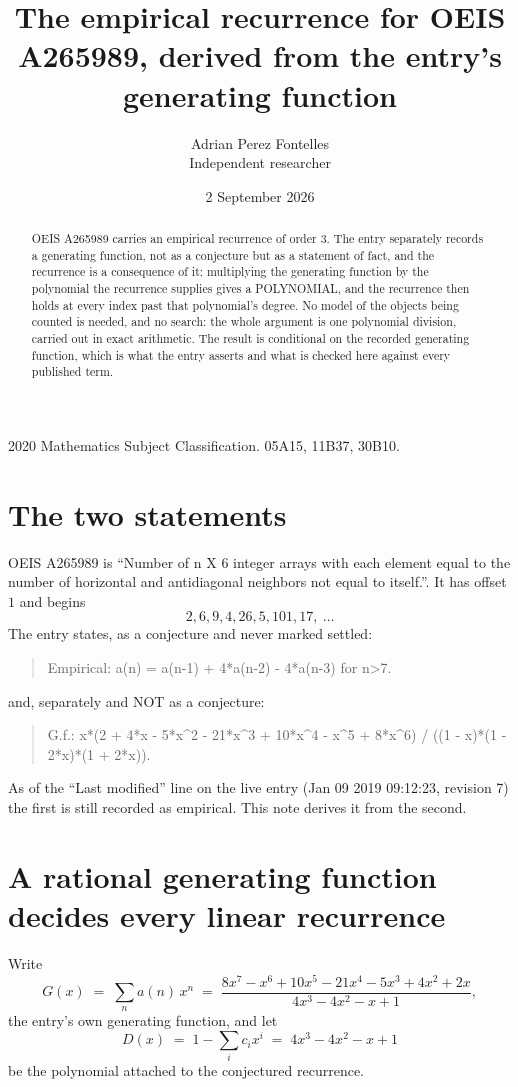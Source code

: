 \documentclass[11pt,a4paper]{article}
\title{The empirical recurrence for OEIS A265989, derived from the entry's generating function}
\author{Adrian Perez Fontelles\\ \small Independent researcher}
\date{2 September 2026}
\theoremstyle{plain}
\theoremstyle{definition}
\begin{document}
\maketitle

\begin{abstract}
OEIS A265989 carries an empirical recurrence of order $3$. The entry separately records a
generating function, not as a conjecture but as a statement of fact, and the recurrence is a
consequence of it: multiplying the generating function by the polynomial the recurrence
supplies gives a POLYNOMIAL, and the recurrence then holds at every index past that
polynomial's degree. No model of the objects being counted is needed, and no search: the
whole argument is one polynomial division, carried out in exact arithmetic. The result is
conditional on the recorded generating function, which is what the entry asserts and what is
checked here against every published term.
\end{abstract}

\noindent\small 2020 Mathematics Subject Classification. 05A15, 11B37, 30B10.\normalsize

\section{The two statements}

OEIS A265989 is ``Number of n X 6 integer arrays with each element equal to the number of horizontal and antidiagonal neighbors not equal to itself.''. It has offset $1$ and begins
\[
2, 6, 9, 4, 26, 5, 101, 17,\ \dots
\]
The entry states, as a conjecture and never marked settled:
\begin{quote}
Empirical: a(n) = a(n-1) + 4*a(n-2) - 4*a(n-3) for n>7.
\end{quote}
and, separately and NOT as a conjecture:
\begin{quote}
G.f.: x*(2 + 4*x - 5*x\^{}2 - 21*x\^{}3 + 10*x\^{}4 - x\^{}5 + 8*x\^{}6) / ((1 - x)*(1 - 2*x)*(1 + 2*x)).
\end{quote}
As of the ``Last modified'' line on the live entry (Jan 09 2019 09:12:23, revision 7) the first is still
recorded as empirical. This note derives it from the second.

\section{A rational generating function decides every linear recurrence}

Write
\[
G(x)\;=\;\sum_{n}a(n)\,x^{n}\;=\;\frac{8 x^{7} - x^{6} + 10 x^{5} - 21 x^{4} - 5 x^{3} + 4 x^{2} + 2 x}{4 x^{3} - 4 x^{2} - x + 1},
\]
the entry's own generating function, and let
\[
D(x)\;=\;1-\sum_i c_i x^{i}\;=\;4 x^{3} - 4 x^{2} - x + 1
\]
be the polynomial attached to the conjectured recurrence.
\end{document}
